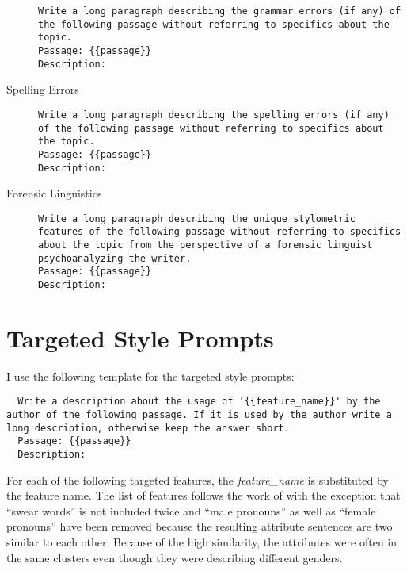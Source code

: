 \begin{description}
\begin{minipage}{\linewidth}
\begin{lstlisting}
Write a long paragraph describing the grammar errors (if any) of the following passage without referring to specifics about the topic.
Passage: {{passage}}
Description:
\end{lstlisting}
        \end{minipage}
  \item[Spelling Errors]\leavevmode \newline
        \begin{minipage}{\linewidth}
          \begin{lstlisting}
Write a long paragraph describing the spelling errors (if any) of the following passage without referring to specifics about the topic.
Passage: {{passage}}
Description:
\end{lstlisting}
        \end{minipage}
  \item[Forensic Linguistics]\leavevmode \newline
        \begin{minipage}{\linewidth}
          \begin{lstlisting}
Write a long paragraph describing the unique stylometric features of the following passage without referring to specifics about the topic from the perspective of a forensic linguist psychoanalyzing the writer.
Passage: {{passage}}
Description:
\end{lstlisting}
        \end{minipage}
\end{description}

\section{Targeted Style Prompts}
\label{sec:appendix:targetPrompts}

I use the following template for the targeted style prompts:
\begin{lstlisting}
  Write a description about the usage of '{{feature_name}}' by the author of the following passage. If it is used by the author write a long description, otherwise keep the answer short.
  Passage: {{passage}}
  Description:
\end{lstlisting}

For each of the following targeted features, the \textit{feature\_name} is substituted by the feature name. The list of features follows the work of \citet{patelLearningInterpretableStyle2023} with the exception that \enquote{swear words} is not included twice and \enquote{male pronouns} as well as \enquote{female pronouns} have been removed because the resulting attribute sentences are two similar to each other. Because of the high similarity, the attributes were often in the same clusters even though they were describing different genders.


